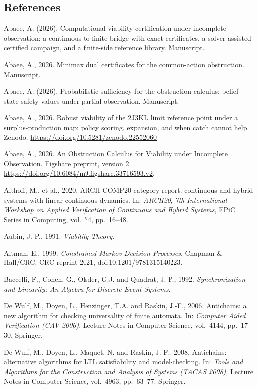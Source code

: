 \documentclass[10pt,twocolumn]{article}
\theoremstyle{plain}
\theoremstyle{definition}
\theoremstyle{remark}
\begin{document}
\subsection*{References}
\label{references}
Abaee, A. (2026). Computational viability certification under incomplete
observation: a continuous-to-finite bridge with exact certificates, a
solver-assisted certified campaign, and a finite-side reference library.
Manuscript.

Abaee, A., 2026. Minimax dual certificates for the common-action
obstruction. Manuscript.

Abaee, A. (2026). Probabilistic sufficiency for the obstruction calculus: belief-state safety values under partial observation. Manuscript.

Abaee, A., 2026. Robust viability of the 2J3KL limit reference point
under a surplus-production map: policy scoring, expansion, and when
catch cannot help. Zenodo.
\url{https://doi.org/10.5281/zenodo.22552060}

Abaee, A., 2026. An Obstruction Calculus for Viability under Incomplete Observation. Figshare preprint, version 2. \url{https://doi.org/10.6084/m9.figshare.33716593.v2}.

Althoff, M., et al., 2020. ARCH-COMP20 category report: continuous and hybrid systems with
linear continuous dynamics. In: \emph{ARCH20, 7th International Workshop on Applied
Verification of Continuous and Hybrid Systems}, EPiC Series in Computing, vol.~74, pp.~16--48.

Aubin, J.-P., 1991. \emph{Viability Theory}.

Altman, E., 1999. \emph{Constrained Markov Decision Processes}. Chapman \& Hall/CRC. CRC
reprint 2021, doi:10.1201/9781315140223.

Baccelli, F., Cohen, G., Olsder, G.J. and Quadrat, J.-P., 1992. \emph{Synchronization and
Linearity: An Algebra for Discrete Event Systems}.


De Wulf, M., Doyen, L., Henzinger, T.A. and Raskin, J.-F., 2006. Antichains: a new
algorithm for checking universality of finite automata. In: \emph{Computer Aided
Verification (CAV 2006)}, Lecture Notes in Computer Science, vol.~4144, pp.~17--30.
Springer.

De Wulf, M., Doyen, L., Maquet, N. and Raskin, J.-F., 2008. Antichains: alternative
algorithms for LTL satisfiability and model-checking. In: \emph{Tools and Algorithms
for the Construction and Analysis of Systems (TACAS 2008)}, Lecture Notes in Computer
Science, vol.~4963, pp.~63--77. Springer.
\end{document}
